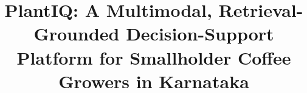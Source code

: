 \IEEEoverridecommandlockouts
\usepackage{cite}
\usepackage{amsmath,amssymb,amsfonts}
\usepackage{algorithm}
\usepackage{algorithmic}
\usepackage{graphicx}
\usepackage{textcomp}
\usepackage[T1]{fontenc}
\usepackage{newtxtext} %
\usepackage{xcolor}
\usepackage{booktabs}
\usepackage{multirow}
\usepackage{makecell}
\usepackage{array}
\usepackage{url}
\usepackage{tikz}
\usepackage{etoolbox}
\patchcmd{\abstract}{---}{:\ }{}{}
\patchcmd{\IEEEkeywords}{---}{:\ }{}{}
\providecommand{\plantiqfigw}{\columnwidth}
\usetikzlibrary{arrows.meta,positioning,fit,backgrounds,calc,shapes.geometric}
\def\BibTeX{{\rm B\kern-.05em{\sc i\kern-.025em b}\kern-.08em
    T\kern-.1667em\lower.7ex\hbox{E}\kern-.125emX}}

\newcommand{\yes}{\checkmark}
\newcommand{\no}{$\times$}
\newcommand{\part}{$\sim$}




\nocite{anudeep2024cnn,selvakumar2024rag}

\title{PlantIQ: A Multimodal, Retrieval-Grounded Decision-Support Platform for Smallholder Coffee Growers in Karnataka}

\newcommand{\authorcell}[3]{%
  \begin{tabular}[t]{@{}c@{}}
    {\large #1}\\[0.4ex]
    \textit{Dept. of Computer Science}\\
    \textit{and Engineering#2}\\
    \textit{PES University}\\
    Bengaluru, India\\
    #3
  \end{tabular}}

